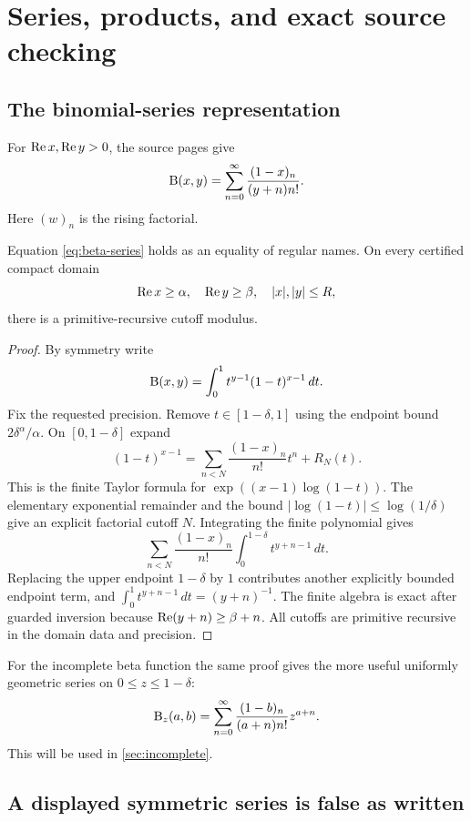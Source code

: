 \section{Series, products, and exact source checking}
\label{sec:series-products}

\subsection{The binomial-series representation}

For $\operatorname{Re} x,\operatorname{Re} y>0$, the source pages give
\begin{equation}
 \mathrm B(x,y)=\sum_{n=0}^{\infty}
 \frac{(1-x)_n}{(y+n)n!}.
 \label{eq:beta-series}
\end{equation}
Here $(w)_n$ is the rising factorial.

\begin{theorem}\label{thm:beta-series}
Equation \eqref{eq:beta-series} holds as an equality of regular names.  On every certified compact domain
\[
 \operatorname{Re} x\ge\alpha,\quad \operatorname{Re} y\ge\beta,\quad |x|,|y|\le R,
\]
there is a primitive-recursive cutoff modulus.
\end{theorem}

\begin{proof}
By symmetry write
\[
 \mathrm B(x,y)=\int_0^1 t^{y-1}(1-t)^{x-1}\,dt.
\]
Fix the requested precision.  Remove $t\in[1-\delta,1]$ using the endpoint bound $2\delta^\alpha/\alpha$.  On $[0,1-\delta]$ expand
\[
 (1-t)^{x-1}
 =\sum_{n<N}\frac{(1-x)_n}{n!}t^n+R_N(t).
\]
This is the finite Taylor formula for $\exp((x-1)\log(1-t))$.  The elementary exponential remainder and the bound $|\log(1-t)|\le\log(1/\delta)$ give an explicit factorial cutoff $N$.  Integrating the finite polynomial gives
\[
 \sum_{n<N}\frac{(1-x)_n}{n!}\int_0^{1-\delta}t^{y+n-1}\,dt.
\]
Replacing the upper endpoint $1-\delta$ by $1$ contributes another explicitly bounded endpoint term, and
$\int_0^1t^{y+n-1}\,dt=(y+n)^{-1}$.  The finite algebra is exact after guarded inversion because $\operatorname{Re}(y+n)\ge\beta+n$.  All cutoffs are primitive recursive in the domain data and precision.
\end{proof}

For the incomplete beta function the same proof gives the more useful uniformly geometric series on $0\le z\le1-\delta$:
\[
 \mathrm B_z(a,b)=
 \sum_{n=0}^{\infty}
 \frac{(1-b)_n}{(a+n)n!}z^{a+n}.
\]
This will be used in \cref{sec:incomplete}.

\subsection{A displayed symmetric series is false as written}


